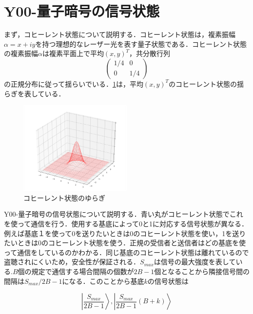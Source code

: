 \documentclass[a4j,twocolumn]{jarticle}
\def \figref #1{\figurename\ref{#1}}
\begin{document}
\section{Y00-量子暗号の信号状態
}
まず，コヒーレント状態について説明する．コヒーレント状態は，複素振幅$\alpha=x+iy$を持つ理想的なレーザー光を表す量子状態である．コヒーレント状態の複素振幅$\alpha$は複素平面上で平均$(x,y)^T$，共分散行列 
$$
\begin{pmatrix}
1/4&0\\
0&1/4
\end{pmatrix}
$$
の正規分布に従って揺らいでいる．\figref{Fig:3_1}は，平均$(x,y)^T$のコヒーレント状態の揺らぎを表している．

\begin{figure}[htbp]
        \centering   
        \includegraphics[width=0.5\textwidth]{img/zemi1.png}
        \caption[sample image (png)]{コヒーレント状態のゆらぎ}
        \label{Fig:3_1}
    \end{figure}
    



Y00-量子暗号の信号状態について説明する．青い丸がコヒーレント状態でこれを使って通信を行う．使用する基底によって0と1に対応する信号状態が異なる．例えば基底１を使って0を送りたいときは0のコヒーレント状態を使い，1を送りたいときは0のコヒーレント状態を使う．正規の受信者と送信者はどの基底を使って通信をしているのかわかる．同じ基底のコヒーレント状態は離れているので盗聴されにくいため，安全性が保証される．$S_{max}$は信号の最大強度を表している.$B$個の規定で通信する場合間隔の個数が$2B-1$個となることから隣接信号間の間隔は$S_{max}/2B-1$になる．このことから基底$k$の信号状態は

$$
\left |\frac{S_{max}}{2B-1}\right\rangle,\left |\frac{S_{max}}{2B-1}(B+k)\right\rangle
$$
\end{document}
